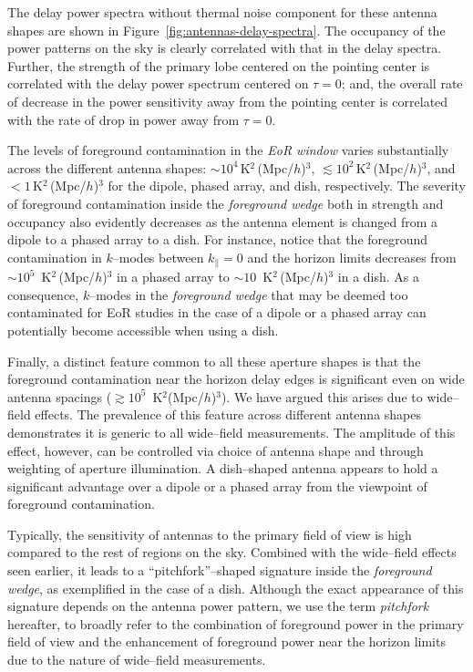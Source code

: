\documentclass[preprint2,iop,numberedappendix,twocolappendix,appendixfloats]{emulateapj}
\begin{document}
The delay power spectra without thermal noise component for these antenna shapes are shown in Figure~\ref{fig:antennas-delay-spectra}. The occupancy of the power patterns on the sky is clearly correlated with that in the delay spectra. Further, the strength of the primary lobe centered on the pointing center is correlated with the delay power spectrum centered on $\tau=0$; and, the overall rate of decrease in the power sensitivity away from the pointing center is correlated with the rate of drop in power away from $\tau=0$. 

The levels of foreground contamination in the {\it EoR window} varies substantially across the different antenna shapes: $\sim 10^4\,$K$^2\,$(Mpc/$h$)$^3$, $\lesssim 10^2\,$K$^2\,$(Mpc/$h$)$^3$, and $<1\,$K$^2\,$(Mpc/$h$)$^3$ for the dipole, phased array, and dish, respectively. The severity of foreground contamination inside the {\it foreground wedge} both in strength and occupancy also evidently decreases as the antenna element is changed from a dipole to a phased array to a dish. For instance, notice that the foreground contamination in $k$--modes between $k_\parallel=0$ and the horizon limits decreases from $\sim 10^5$~K$^2\,$(Mpc/$h$)$^3$ in a phased array to $\sim 10$~K$^2\,$(Mpc/$h$)$^3$ in a dish. As a consequence, $k$--modes in the {\it foreground wedge} that may be deemed too contaminated for EoR studies in the case of a dipole or a phased array can potentially become accessible when using a dish.

Finally, a distinct feature common to all these aperture shapes is that the foreground contamination near the horizon delay edges is significant even on wide antenna spacings ($\gtrsim 10^5$~K$^2$(Mpc/$h$)$^3$). We have argued this arises due to wide--field effects. The prevalence of this feature across different antenna shapes demonstrates it is generic to all wide--field measurements. The amplitude of this effect, however, can be controlled via choice of antenna shape and through weighting of aperture illumination. A dish--shaped antenna appears to hold a significant advantage over a dipole or a phased array from the viewpoint of foreground contamination. 

Typically, the sensitivity of antennas to the primary field of view is high compared to the rest of regions on the sky. Combined with the wide--field effects seen earlier, it leads to a ``pitchfork''--shaped signature inside the {\it foreground wedge}, as exemplified in the case of a dish. Although the exact appearance of this signature depends on the antenna power pattern, we use the term {\it pitchfork} hereafter, to broadly refer to the combination of foreground power in the primary field of view and the enhancement of foreground power near the horizon limits due to the nature of wide--field measurements.
\end{document}
